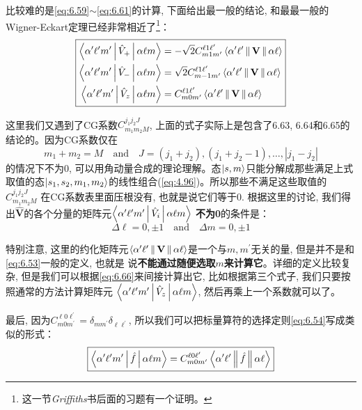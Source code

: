 比较难的是\ref{eq:6.59}$\sim$\ref{eq:6.61}的计算, 下面给出最一般的结论, 和最最一般的Wigner-Eckart定理已经非常相近了\footnote{这一节{\itshape Griffiths}书后面的习题有一个证明。}：
\begin{equation}
    \label{eq:6.66}
    \boxed{
        \begin{aligned}
            \Braket{\alpha^{\prime} \ell^{\prime} m^{\prime}|\hat{V}_{+}| \alpha \ell m}  & = -\sqrt{2}C^{\ell 1 \ell^\prime}_{m 1 m^\prime}\Braket{\alpha^\prime\ell^\prime\|\mathbf{V}\|\alpha\ell}\\
            \Braket{\alpha^{\prime} \ell^{\prime} m^{\prime}|\hat{V}_{-}| \alpha \ell m}  & =  \sqrt{2}C^{\ell 1 \ell^\prime}_{m -1 m^\prime}\Braket{\alpha^\prime\ell^\prime\|\mathbf{V}\|\alpha\ell}\\
            \Braket{\alpha^{\prime} \ell^{\prime} m^{\prime}|\hat{V}_{z}| \alpha \ell m}  & =  C^{\ell 1 \ell^\prime}_{m 0 m^\prime}\Braket{\alpha^\prime\ell^\prime\|\mathbf{V}\|\alpha\ell}
        \end{aligned}
    }
\end{equation}

这里我们又遇到了CG系数$C^{j_1j_2J}_{m_1m_2M}$, 上面的式子实际上是包含了6.63, 6.64和6.65的结论的。因为CG系数仅在
\[m_1+m_2=M\quad\text{and}\quad J=(j_1+j_2),(j_1+j_2-1),\ldots,|j_1-j_2|\]
的情况下不为0, 可以用角动量合成的理论理解。态$\ket{s,m}$只能分解成那些满足上式取值的态$\ket{s_1,s_2,m_1,m_2}$的线性组合(\ref{eq:4.96})。所以那些不满足这些取值的$C^{j_1j_2J}_{m_1m_2M}$
在CG系数表里面压根没有, 也就是说它们等于0. 根据这里的讨论, 我们得出$\hat{\mathbf{V}}$的各个分量的矩阵元$\Braket{\alpha^{\prime} \ell^{\prime} m^{\prime}|\hat{V}_{i}| \alpha \ell m} $
\textbf{不为0}的条件是：
\begin{equation*}
    \boxed{
        \Delta \ell = 0,\pm 1\quad \text{and}\quad \Delta m = 0,\pm 1 
    }
\end{equation*}

特别注意, 这里的约化矩阵元$\Braket{\alpha^\prime\ell^\prime\|\mathbf{V}\|\alpha\ell}$是一个与$m,m^\prime$无关的量, 但是并不是和\ref{eq:6.53}一般的定义, 也就是
说\textbf{不能通过随便选取$m$来计算它}。详细的定义比较复杂, 但是我们可以根据\ref{eq:6.66}来间接计算出它, 比如根据第三个式子, 我们只要按照通常的方法计算矩阵元
$\Braket{\alpha^{\prime} \ell^{\prime} m^{\prime}|\hat{V}_{z}| \alpha \ell m} $, 然后再乘上一个系数就可以了。

最后, 因为$C^{\ell 0\ell^\prime}_{m0m^\prime}=\delta_{mm^\prime}\delta_{\ell\ell^\prime}$, 所以我们可以把标量算符的选择定则\ref{eq:6.54}写成类似的形式：
\begin{equation}
    \boxed{\Braket{\alpha^\prime\ell^\prime m^\prime|\hat{f}|\alpha \ell m}=C^{\ell 0\ell^\prime}_{m0m^\prime}\Braket{\alpha^\prime \ell^\prime \|\hat{f}\|\alpha\ell }}
\end{equation}

